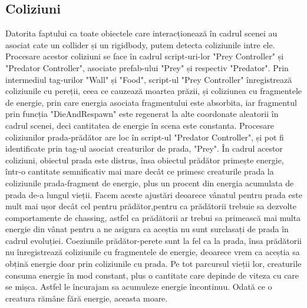 \subsection*{Coliziuni}
Datorita faptului ca toate obiectele care interacționează în cadrul scenei au asociat cate un collider și un rigidbody, putem detecta coliziunile intre ele.
Procesare acestor coliziuni se face în cadrul script-uri-lor "Prey Controller" și "Predator Controller", asociate prefab-ului "Prey" și respectiv "Predator".
Prin intermediul tag-urilor "Wall" și "Food", script-ul "Prey Controller" înregistrează coliziunile cu pereții, ceea ce cauzează moartea prăzii, și coliziunea cu fragmentele de energie, prin care energia asociata fragmentului este absorbita, iar fragmentul prin funcția "DieAndRespawn" este regenerat la alte coordonate aleatorii în cadrul scenei, deci cantitatea de energie în scena este constanta.
Procesare coliziunilor prada-prădător are loc în script-ul "Predator Controller", și pot fi identificate prin tag-ul asociat creaturilor de prada, "Prey". În cadrul acestor coliziuni, obiectul prada este distrus, însa obiectul prădător primește energie, într-o cantitate semnificativ mai mare decât ce primesc creaturile prada la coliziunile prada-fragment de energie, plus un procent din energia acumulata de prada de-a lungul vieții.
Facem aceste ajustări deoarece vânatul pentru prada este mult mai ușor decât cel pentru prădător,pentru ca prădătorii trebuie sa dezvolte comportamente de chassing, astfel ca prădătorii ar trebui sa primească mai multa energie din vânat pentru a ne asigura ca aceștia nu sunt surclasați de prada în cadrul evoluției.
Coeziunile prădător-perete sunt la fel ca la prada, însa prădătorii nu înregistrează coliziunile cu fragmentele de energie, deoarece vrem ca aceștia sa obțină energie doar prin coliziunile cu prada.
Pe tot parcursul vieții lor, creaturile consuma energie în mod constant, plus o cantitate care depinde de viteza cu care se mișca. Astfel le încurajam sa acumuleze energie încontinuu.
Odată ce o creatura rămâne fără energie, aceasta moare.

